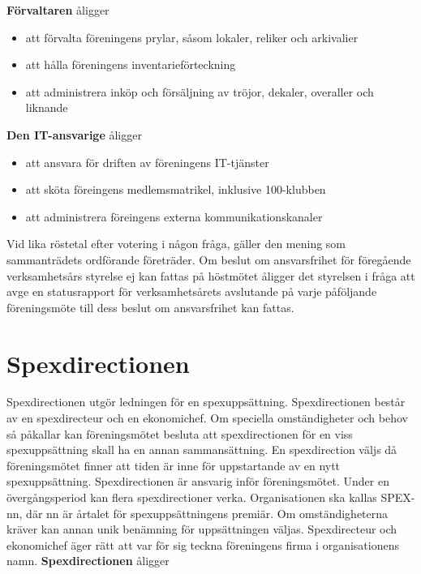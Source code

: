 \documentclass[a4paper]{article}
\begin{document}
\noindent
\textbf{Förvaltaren} åligger

\begin{itemize}
  \item att förvalta föreningens prylar, såsom lokaler, reliker och arkivalier
  \item att hålla föreningens inventarieförteckning
  \item att administrera inköp och försäljning av tröjor, dekaler, overaller och liknande
\end{itemize}

\noindent
\textbf{Den IT-ansvarige} åligger

\begin{itemize}
  \item att ansvara för driften av föreningens IT-tjänster
  \item att sköta föreingens medlemsmatrikel, inklusive 100-klubben
  \item att administrera föreingens externa kommunikationskanaler
\end{itemize}

\noindent
Vid lika röstetal efter votering i någon fråga, gäller den mening som sammanträdets ordförande företräder.\newline
\newline
Om beslut om ansvarsfrihet för föregående verksamhetsårs styrelse ej kan fattas på höstmötet åligger det styrelsen i fråga att avge en statusrapport för verksamhetsårets avslutande på varje påföljande föreningsmöte till dess beslut om ansvarsfrihet kan fattas.\newline

\section{Spexdirectionen}
\label{section:spexdirectionen}
Spexdirectionen utgör ledningen för en spexuppsättning.\newline
\newline
Spexdirectionen består av en spexdirecteur och en ekonomichef.\newline
\newline
Om speciella omständigheter och behov så påkallar kan föreningsmötet besluta att spexdirectionen för en viss spexuppsättning skall ha en annan sammansättning.\newline
\newline
En spexdirection väljs då föreningsmötet finner att tiden är inne för uppstartande av en nytt spexuppsättning. Spexdirectionen är ansvarig inför föreningsmötet. Under en övergångsperiod kan flera spexdirectioner verka.\newline
\newline
Organisationen ska kallas SPEX-nn, där nn är årtalet för spexuppsättningens premiär. Om omständigheterna kräver kan annan unik benämning för uppsättningen väljas.\newline
\newline
Spexdirecteur och ekonomichef äger rätt att var för sig teckna föreningens firma i organisationens namn.\newline
\newline
\textbf{Spexdirectionen} åligger
\end{document}
